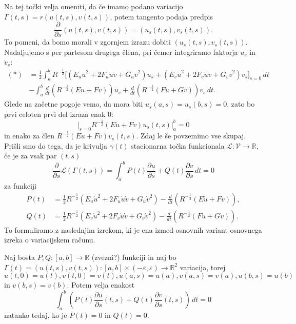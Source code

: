 Na tej točki velja omeniti, da če imamo podano variacijo $\Gamma(t,s) = r(u(t,s), v(t,s))$, potem tangento podaja predpis \begin{equation*}
\frac{ \partial  }{ \partial s } (u(t,s), v(t,s)) = (u_s(t,s), v_s(t,s)).
\end{equation*}  
To pomeni, da bomo morali v zgornjem izrazu dobiti $(u_s(t,s), v_s(t,s))$. Nadaljujemo s per partesom drugega člena, pri čemer integriramo faktorja $\dot{u}_s$ in $\dot{v}_s$: \begin{align*}
    (*) &= \frac{1}{2} \int_{a}^{b}  R^{-\frac{1}{2}} \bigg[ (E_u \dot{u}^2 + 2F_u \dot{u} \dot{v} + G_u \dot{v}^2) u_s + (E_v \dot{u}^2 + 2F_v \dot{u} \dot{v} + G_v \dot{v}^2)v_s \bigg]_{s = 0} \, dt \\
    &- \int_{a}^{b} \frac{ d  }{ dt } \left( R^{-\frac{1}{2}} (E\dot{u} + F\dot{v}) \right) u_s  + \frac{ d }{ dt } \left( R^{-\frac{1}{2}} (F\dot{u} + G\dot{v}) \right) v_s \, dt.
\end{align*}
Glede na začetne pogoje vemo, da mora biti $u_s(a,s) = u_s(b,s) = 0$, zato bo prvi celoten prvi del izraza enak 0: \begin{equation*}
\bigg|_{s = 0} R^{-\frac{1}{2}} (E\dot{u} + F\dot{v}) u_s(t,s) \bigg|_a^{b} = 0
\end{equation*}  
in enako za člen $R^{-\frac{1}{2}} (E\dot{u} + F\dot{v}) v_s(t,s)$. Zdaj le še povzemimo vse skupaj.
Prišli smo do tega, da je krivulja $\gamma(t)$ stacionarna točka funkcionala $\mathcal{L}: \mathcal{V} \to  \mathbb{R}$, če je za vsak par $(t,s)$\begin{equation*}
\frac{ \partial  }{ \partial s } \mathcal{L}(\Gamma(t,s)) = \int_{a}^{b} P(t) \frac{ \partial u }{ \partial s } + Q(t) \frac{ \partial v }{ \partial s }  \, dt  = 0  
\end{equation*}
za funkciji \begin{align*}
    P(t) &= \frac{1}{2} R^{-\frac{1}{2}} (E_u \dot{u}^2 + 2F_u \dot{u} \dot{v} + G_u \dot{v}^2) - \frac{d}{dt} (R^{-\frac{1}{2}}(E\dot{u} + F\dot{v})), \\
    Q(t) &= \frac{1}{2} R^{-\frac{1}{2}} (E_v \dot{u}^2 + 2F_v \dot{u} \dot{v} + G_v \dot{v}^2) - \frac{d}{dt} (R^{-\frac{1}{2}}(F\dot{u} + G\dot{v})).
\end{align*}
To formuliramo z naslednjim izrekom, ki je ena izmed osnovnih variant osnovnega izreka o variacijskem računu.

\begin{izrek}
\label{izr_osnovni_izrek_o_variacijskem_racunu}
Naj bosta $P, Q: [a,b] \to  \mathbb{R}$ (zvezni?) funkciji in naj bo $\Gamma(t) = (u(t,s), v(t,s)) : [a,b] \times (-\varepsilon, \varepsilon) \to \mathbb{R}^2$ variacija, torej $u(t, 0) = u(t), v(t, 0) = v(t), u(a,s) = u(a), v(a,s) = v(a), u(b,s) = u(b)$ in $v(b,s) = v(b)$. Potem velja enakost \begin{equation*}
 \int_{a}^{b}  \left( P(t) \frac{ \partial u }{ \partial s }(t, s)  + Q(t) \frac{ \partial v }{ \partial s }(t, s) \right)  \, dt = 0 
 \end{equation*}  
natanko tedaj, ko je $P(t) = 0$ in $Q(t) = 0$.
\end{izrek}

